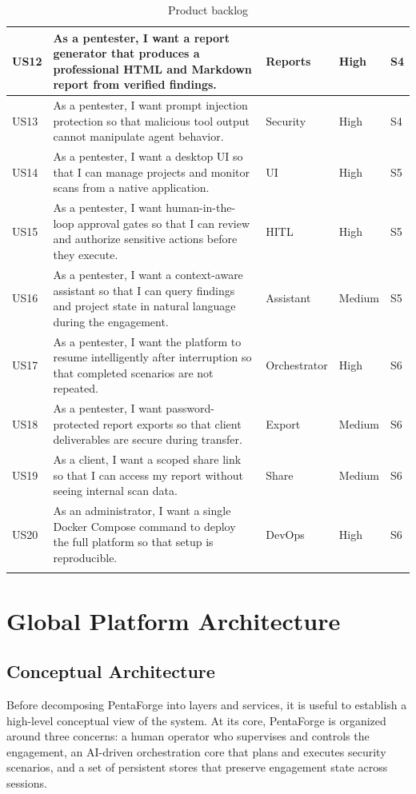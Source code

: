 \documentclass[12pt,a4paper]{report}
\begin{document}
\begin{longtable}{|p{}|p{}|p{}|p{}|p{}|}
\hline
US12 & As a pentester, I want a report generator that produces a professional HTML
and Markdown report from verified findings. & Reports & High & S4 \\
\hline
US13 & As a pentester, I want prompt injection protection so that malicious tool
output cannot manipulate agent behavior. & Security & High & S4 \\
\hline
US14 & As a pentester, I want a desktop UI so that I can manage projects and monitor
scans from a native application. & UI & High & S5 \\
\hline
US15 & As a pentester, I want human-in-the-loop approval gates so that I can review
and authorize sensitive actions before they execute. & HITL & High & S5 \\
\hline
US16 & As a pentester, I want a context-aware assistant so that I can query findings
and project state in natural language during the engagement. & Assistant & Medium & S5 \\
\hline
US17 & As a pentester, I want the platform to resume intelligently after interruption
so that completed scenarios are not repeated. & Orchestrator & High & S6 \\
\hline
US18 & As a pentester, I want password-protected report exports so that client
deliverables are secure during transfer. & Export & Medium & S6 \\
\hline
US19 & As a client, I want a scoped share link so that I can access my report
without seeing internal scan data. & Share & Medium & S6 \\
\hline
US20 & As an administrator, I want a single Docker Compose command to deploy the
full platform so that setup is reproducible. & DevOps & High & S6 \\
\hline
\caption{Product backlog}
\label{tab:product_backlog}
\end{longtable}

\section{Global Platform Architecture}

\subsection{Conceptual Architecture}

Before decomposing PentaForge into layers and services, it is useful to establish
a high-level conceptual view of the system. At its core, PentaForge is organized
around three concerns: a human operator who supervises and controls the engagement,
an AI-driven orchestration core that plans and executes security scenarios, and a
set of persistent stores that preserve engagement state across sessions.
\end{document}
